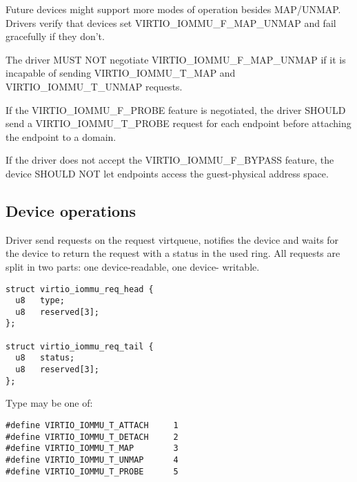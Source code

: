 Future devices might support more modes of operation besides MAP/UNMAP.
Drivers verify that devices set VIRTIO_IOMMU_F_MAP_UNMAP and fail
gracefully if they don't.


The driver MUST NOT negotiate VIRTIO_IOMMU_F_MAP_UNMAP if it is incapable
of sending VIRTIO_IOMMU_T_MAP and VIRTIO_IOMMU_T_UNMAP requests.

If the VIRTIO_IOMMU_F_PROBE feature is negotiated, the driver SHOULD send a
VIRTIO_IOMMU_T_PROBE request for each endpoint before attaching the
endpoint to a domain.


If the driver does not accept the VIRTIO_IOMMU_F_BYPASS feature, the
device SHOULD NOT let endpoints access the guest-physical address space.

\subsection{Device operations}\label{sec:Device Types / IOMMU Device / Device operations}

Driver send requests on the request virtqueue, notifies the device and
waits for the device to return the request with a status in the used ring.
All requests are split in two parts: one device-readable, one device-
writable.

\begin{lstlisting}
struct virtio_iommu_req_head {
  u8   type;
  u8   reserved[3];
};

struct virtio_iommu_req_tail {
  u8   status;
  u8   reserved[3];
};
\end{lstlisting}

Type may be one of:

\begin{lstlisting}
#define VIRTIO_IOMMU_T_ATTACH     1
#define VIRTIO_IOMMU_T_DETACH     2
#define VIRTIO_IOMMU_T_MAP        3
#define VIRTIO_IOMMU_T_UNMAP      4
#define VIRTIO_IOMMU_T_PROBE      5
\end{lstlisting}

